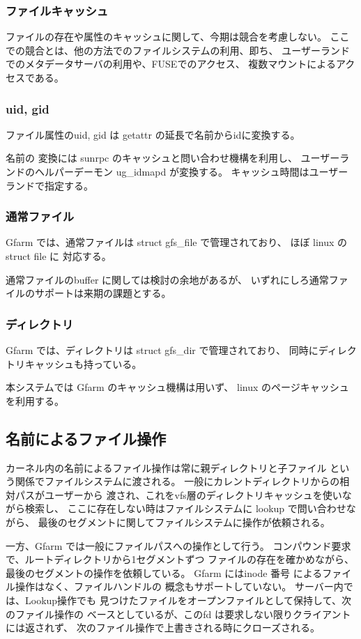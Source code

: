 \subsubsection{ファイルキャッシュ}
	ファイルの存在や属性のキャッシュに関して、今期は競合を考慮しない。
	ここでの競合とは、他の方法でのファイルシステムの利用、即ち、
	ユーザーランドでのメタデータサーバの利用や、FUSEでのアクセス、
	複数マウントによるアクセスである。

\subsubsection{uid, gid}
	ファイル属性のuid, gid は getattr の延長で名前からidに変換する。

	名前の 変換には sunrpc のキャッシュと問い合わせ機構を利用し、
	ユーザーランドのヘルパーデーモン ug_idmapd が変換する。
	キャッシュ時間はユーザーランドで指定する。

\subsubsection{通常ファイル}
	Gfarm では、通常ファイルは struct gfs_file で管理されており、
	ほぼ linux の struct file に 対応する。

	通常ファイルのbuffer に関しては検討の余地があるが、
	いずれにしろ通常ファイルのサポートは来期の課題とする。

\subsubsection{ディレクトリ}
	Gfarm では、ディレクトリは struct gfs_dir で管理されており、
	同時にディレクトリキャッシュも持っている。
	
	本システムでは Gfarm のキャッシュ機構は用いず、
	linux のページキャッシュを利用する。

\subsection{名前によるファイル操作}
	カーネル内の名前によるファイル操作は常に親ディレクトリと子ファイル
	という関係でファイルシステムに渡される。
	一般にカレントディレクトリからの相対パスがユーザーから
	渡され、これをvfs層のディレクトリキャッシュを使いながら検索し、
	ここに存在しない時はファイルシステムに lookup で問い合わせながら、
	最後のセグメントに関してファイルシステムに操作が依頼される。


	一方、Gfarm では一般にファイルパスへの操作として行う。
	コンパウンド要求で、ルートディレクトリから1セグメントずつ
	ファイルの存在を確かめながら、最後のセグメントの操作を依頼している。
	Gfarm にはinode 番号 によるファイル操作はなく、ファイルハンドルの
	概念もサポートしていない。
	サーバー内では、Lookup操作でも
	見つけたファイルをオープンファイルとして保持して、次のファイル操作の
	ベースとしているが、このfd は要求しない限りクライアントには返されず、
	次のファイル操作で上書きされる時にクローズされる。

